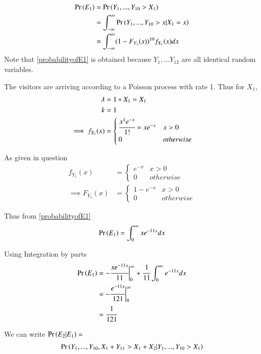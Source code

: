 \documentclass[journal,12pt,twocolumn]{IEEEtran}
\begin{document}
\begin{align}
    \Pr\left(E_1\right) &= \Pr\left(Y_1,...,Y_{10} > X_1\right)\\
             &= \int_{-\infty}^{\infty} \Pr\left(Y_1,...,Y_{10} > x|X_1 = x\right)\\
             &= \int_{-\infty}^{\infty} (1-F_{Y_1}(x))^{10} f_{X_1}(x)dx \label{probabilityofE1}
\end{align}
Note that \eqref{probabilityofE1} is obtained because $Y_1,...Y_{12}$ are all identical random variables. 

The visitors are arriving according to a Poisson process with rate 1. Thus for $X_1$, 
\begin{align}
    \lambda &= 1*X_1 = X_1\\
    k &= 1\\
    \implies f_{X_1}(x) &= 
    \begin{cases}
        \cfrac{x^1e^{-x}}{1!} = x e^{-x} &x > 0\\
        0                                &otherwise
    \end{cases}
\end{align}

As given in question
\begin{align}
    f_{Y_1}(x) &= 
    \begin{cases}
        e^{-x} & x > 0\\
        0      & otherwise
    \end{cases}\\
    \implies F_{Y_1}(x) &= 
    \begin{cases}
        1-e^{-x} & x > 0\\
        0        & otherwise
    \end{cases}
\end{align}

Thus from \eqref{probabilityofE1} 
\begin{align}
    \Pr\left(E_1\right) = \int_{0}^{\infty} x e^{-11x} dx
\end{align}

Using Integration by parts
\begin{align}
    \Pr\left(E_1\right) &= -\cfrac{xe^{-11x}}{11} \biggr \vert_0^{\infty} 
                + \cfrac{1}{11} \int_0^{\infty}e^{-11x}dx\\
             &= -\cfrac{e^{-11x}}{121}\biggr \vert_0^{\infty}\\
             &= \cfrac{1}{121}
\end{align}

We can write $\Pr\left(E_2|E_1\right) =$ 
\begin{align}
    \Pr\left(Y_1,...,Y_{10},X_1+Y_{11} > X_1 + X_2|Y_1,...,Y_{10} > X_1\right)
\end{align}
\end{document}
